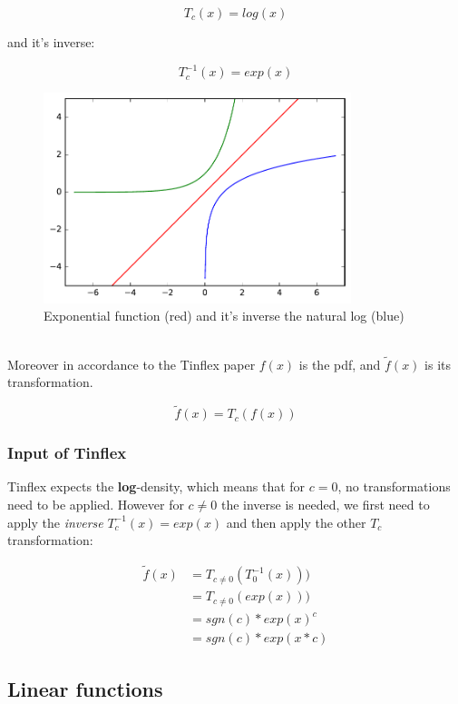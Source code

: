 \[T_c(x) = log(x)  \]

and it's inverse:

\[T_c^{-1}(x) = exp(x) \]

\begin{figure}[h]
\centering
\includegraphics[width=0.8\textwidth]{figs/log_exp}
\caption{Exponential function (red) and it's inverse the natural log (blue)}
\label{fig:log_exp}
\end{figure}

\ \\

Moreover in accordance to the Tinflex paper $f(x)$ is the pdf, and $\tilde{f}(x)$ is its transformation.

\[\tilde{f}(x) = T_c(f(x))  \]

\subsubsection{Input of Tinflex}

Tinflex expects the \textbf{log}-density, which means that for $c = 0$, no transformations need to be applied.
However for $c \neq 0$ the inverse is needed, we first need to apply the \textit{inverse} $T_c^{-1}(x) = exp(x)$ and then apply the other $T_c$ transformation:

\begin{align*}
\tilde{f}(x) &= T_{c \neq 0}(T_0^{-1}(x))) \\
&= T_{c \neq 0}(exp(x))) \\
&= sgn(c) * exp(x)^c \\
&= sgn(c) * exp(x *c)
\end{align*}

\subsection{Linear functions}

